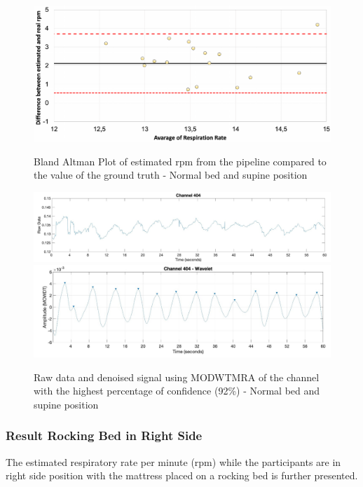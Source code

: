 \begin{figure}[p]
  \centering
  \includegraphics[width=\textwidth]{img/balnd1.pdf}

  \caption{Bland Altman Plot of estimated rpm from the pipeline compared to the value of the ground truth - Normal bed and supine position}
  \label{fig:baln1}
  \vspace{1.5cm}
  \includegraphics[width=\textwidth]{img/404.jpg}
  \includegraphics[width=\textwidth]{img/404_wave.jpg}
\caption{Raw data and denoised signal using MODWTMRA of the channel with the highest percentage of confidence (92\%) - Normal bed and supine position}
  \label{fig:rec}
\end{figure}

\clearpage
\subsubsection{Result Rocking Bed in Right Side }  %

The estimated respiratory rate per minute (rpm) while the participants are in right side position with the mattress placed on a rocking bed is further presented. 

